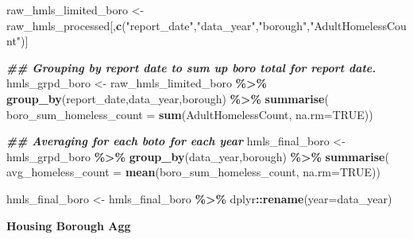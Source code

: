 \documentclass[
]{article}
\newenvironment{Shaded}{\begin{snugshade}}{\end{snugshade}}
\newcommand{\AttributeTok}[1]{\textcolor[rgb]{0.13,0.29,0.53}{#1}}
\newcommand{\ConstantTok}[1]{\textcolor[rgb]{0.56,0.35,0.01}{#1}}
\newcommand{\DocumentationTok}[1]{\textcolor[rgb]{0.56,0.35,0.01}{\textbf{\textit{#1}}}}
\newcommand{\FunctionTok}[1]{\textcolor[rgb]{0.13,0.29,0.53}{\textbf{#1}}}
\newcommand{\NormalTok}[1]{#1}
\newcommand{\OtherTok}[1]{\textcolor[rgb]{0.56,0.35,0.01}{#1}}
\newcommand{\SpecialCharTok}[1]{\textcolor[rgb]{0.81,0.36,0.00}{\textbf{#1}}}
\newcommand{\StringTok}[1]{\textcolor[rgb]{0.31,0.60,0.02}{#1}}
\begin{document}
\begin{Shaded}
\begin{Highlighting}[]
\NormalTok{raw\_hmls\_limited\_boro }\OtherTok{\textless{}{-}}\NormalTok{ raw\_hmls\_processed[,}\FunctionTok{c}\NormalTok{(}\StringTok{"report\_date"}\NormalTok{,}\StringTok{"data\_year"}\NormalTok{,}\StringTok{"borough"}\NormalTok{,}\StringTok{"AdultHomelessCount"}\NormalTok{)]}

\DocumentationTok{\#\# Grouping by report date to sum up boro total for report date.}
\NormalTok{hmls\_grpd\_boro }\OtherTok{\textless{}{-}}\NormalTok{ raw\_hmls\_limited\_boro }\SpecialCharTok{\%\textgreater{}\%}
  \FunctionTok{group\_by}\NormalTok{(report\_date,data\_year,borough) }\SpecialCharTok{\%\textgreater{}\%}
  \FunctionTok{summarise}\NormalTok{(}
    \AttributeTok{boro\_sum\_homeless\_count =} \FunctionTok{sum}\NormalTok{(AdultHomelessCount, }\AttributeTok{na.rm=}\ConstantTok{TRUE}\NormalTok{))}

\DocumentationTok{\#\# Averaging for each boto for each year}
\NormalTok{hmls\_final\_boro }\OtherTok{\textless{}{-}}\NormalTok{ hmls\_grpd\_boro }\SpecialCharTok{\%\textgreater{}\%}
  \FunctionTok{group\_by}\NormalTok{(data\_year,borough) }\SpecialCharTok{\%\textgreater{}\%}
  \FunctionTok{summarise}\NormalTok{(}
    \AttributeTok{avg\_homeless\_count =} \FunctionTok{mean}\NormalTok{(boro\_sum\_homeless\_count, }\AttributeTok{na.rm=}\ConstantTok{TRUE}\NormalTok{))}

\NormalTok{hmls\_final\_boro }\OtherTok{\textless{}{-}}\NormalTok{ hmls\_final\_boro }\SpecialCharTok{\%\textgreater{}\%}\NormalTok{ dplyr}\SpecialCharTok{::}\FunctionTok{rename}\NormalTok{(}\AttributeTok{year=}\NormalTok{data\_year)}
\end{Highlighting}
\end{Shaded}

\textbf{Housing Borough Agg}
\end{document}

